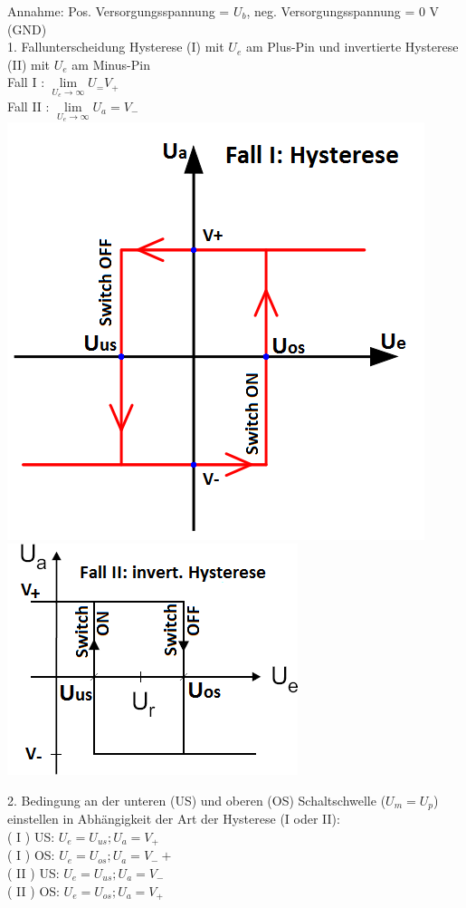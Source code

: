 \documentclass[fs, footer]{latex4ei}
\begin{document}
\begin{multicols*}{4}
{Annahme: Pos. Versorgungsspannung = $U_b$, neg. Versorgungsspannung = 0 V (GND) \\

1. Fallunterscheidung Hysterese (I) mit $U_e$ am Plus-Pin und invertierte Hysterese (II) mit $U_e$ am Minus-Pin\\
Fall I : \(\lim\limits_{U_e \to \infty} U_ = V_+ \) \\
Fall II : \(\lim\limits_{U_e \to \infty} U_a = V_- \) \\
\includegraphics[scale = 0.2]{./img/Hysterese.png}
\includegraphics[scale = 0.4]{./img/Hysterese_invertiert.png}

2. Bedingung an der unteren (US) und oberen (OS) Schaltschwelle ($U_m = U_p$) einstellen in Abhängigkeit der Art der Hysterese (I oder II): \\
 ( I ) US: $ U_e = U_{us}; U_a = V_{+} $ \\
 ( I ) OS: $ U_e = U_{os}; U_a = V_{-}+ $ \\
 ( II ) US: $ U_e = U_{us}; U_a = V_{-} $ \\
 ( II ) OS: $ U_e = U_{os}; U_a = V_{+} $ \\
 
}
\end{multicols*}
\end{document}
